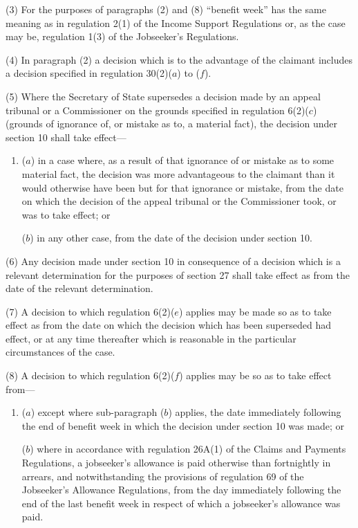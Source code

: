 \documentclass[12pt,a4paper]{article}
\begin{document}
(3) For the purposes of paragraphs (2) and (8) “benefit week” has the same meaning as in regulation 2(1) of the Income Support Regulations or, as the case may be, regulation 1(3) of the Jobseeker’s Regulations.

(4) In paragraph (2) a decision which is to the advantage of the claimant includes a decision specified in regulation 30(2)($a$) to ($f$).

(5) Where the Secretary of State supersedes a decision made by an appeal tribunal or a Commissioner on the grounds specified in regulation 6(2)($c$) (grounds of ignorance of, or mistake as to, a material fact), the decision under section 10 shall take effect—
\begin{enumerate}\item[]
($a$) in a case where, as a result of that ignorance of or mistake as to some material fact, the decision was more advantageous to the claimant than it would otherwise have been but for that ignorance or mistake, from the date on which the decision of the appeal tribunal or the Commissioner took, or was to take effect; or

($b$) in any other case, from the date of the decision under section 10.
\end{enumerate}

(6) Any decision made under section 10 in consequence of a decision which is a relevant determination for the purposes of section 27 shall take effect as from the date of the relevant determination.

(7) A decision to which regulation 6(2)($e$) applies may be made so as to take effect as from the date on which the decision which has been superseded had effect, or at any time thereafter which is reasonable in the particular circumstances of the case.

(8) A decision to which regulation 6(2)($f$) applies may be so as to take effect from—
\begin{enumerate}\item[]
($a$) except where sub-paragraph ($b$) applies, the date immediately following the end of benefit week in which the decision under section 10 was made; or

($b$) where in accordance with regulation 26A(1) of the Claims and Payments Regulations, a jobseeker’s allowance is paid otherwise than fortnightly in arrears, and notwithstanding the provisions of regulation 69 of the Jobseeker’s Allowance Regulations, from the day immediately following the end of the last benefit week in respect of which a jobseeker’s allowance was paid.
\end{enumerate}
\end{document}
